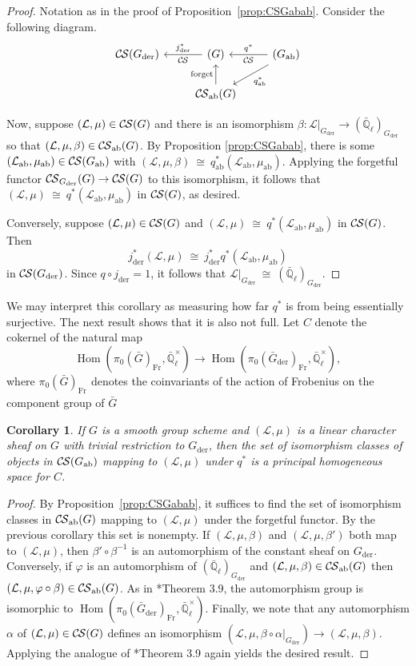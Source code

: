 \documentclass[10pt]{amsart}
\theoremstyle{plain}
\newtheorem{corollary}[theorem]{Corollary}
\theoremstyle{definition}
\newcommand{\EE}{\mathbb{\bar Q}_\ell}
\newcommand{\EEx}{\EE^\times}
\newcommand{\Frob}[1]{\operatorname{Fr}_{#1}}
\DeclareMathOperator{\Hom}{Hom}
\newcommand{\der}{_{\operatorname{der}}}
\newcommand{\ab}{_{\operatorname{ab}}}
\newcommand{\iso}{{\ \cong\ }}
\newcommand{\cs}[1]{{\mathcal{#1}}}
\newcommand{\CS}{{\mathcal{C\hskip-0.8pt S}}}
\begin{document}
\begin{proof}
Notation as in the proof of Proposition~\ref{prop:CSGabab}.
Consider the following diagram.
\[
\begin{tikzcd}
\CS(G\der) & \arrow{l}[swap]{j\der^*} \CS(G) &\arrow{l}[swap]{q^*} 
\CS(G\ab) \arrow{dl}{q\ab^*} \\
& \CS\ab(G) \arrow{u}{\text{forget}}  & 
\end{tikzcd}
\]

Now, suppose $(\cs{L},\mu)\in \CS(G)$ and there is an isomorphism $\beta : \cs{L}\vert_{G\der} \to (\EE)_{G\der}$ so that
$(\cs{L},\mu,\beta) \in \CS\ab(G)$.
By Proposition \ref{prop:CSGabab}, there is some $(\cs{L}\ab,\mu\ab)\in \CS(G\ab)$ with $(\cs{L},\mu,\beta) \iso q\ab^*(\cs{L}\ab,\mu\ab)$.
Applying the forgetful functor $\CS_{G\der}(G)\to \CS(G)$ to this isomorphism, it follows that $(\cs{L},\mu) \iso q^*(\cs{L}\ab,\mu\ab)$ in $\CS(G)$, as desired. 

Conversely, suppose $(\cs{L},\mu)\in \CS(G)$ and $(\cs{L},\mu) \iso q^*(\cs{L}\ab,\mu\ab)$ in $\CS(G)$.
Then 
\[
j\der^*(\cs{L},\mu) \iso j\der^*q^*(\cs{L}\ab,\mu\ab)
\]
 in $\CS(G\der)$.
Since $q\circ j\der = 1$, it follows that $\cs{L}\vert_{G\der} \iso (\EE)_{G\der}$.
\end{proof}

We may interpret this corollary as measuring how far $q^*$ is from being essentially surjective.  The next result shows that it is also not full.
Let $C$ denote the cokernel of the natural map
\[
\Hom(\pi_0(\bar{G})_{\Frob{}}, \EEx) \to \Hom(\pi_0(\bar{G}\der)_{\Frob{}}, \EEx),
\]
where $\pi_0(\bar{G})_{\Frob{}}$ denotes the coinvariants of the action of Frobenius on
the component group of $\bar{G}$

\begin{corollary}
If $G$ is a smooth group scheme and $(\cs{L},\mu)$ is a linear character sheaf on $G$ with trivial restriction to $G\der$,
then the set of isomorphism classes of objects in $\CS(G\ab)$ mapping to $(\cs{L},\mu)$ under $q^*$ is a principal homogeneous space
for $C$.
\end{corollary}
\begin{proof}
By Proposition~\ref{prop:CSGabab}, it suffices to find the set of isomorphism classes in $\CS\ab(G)$ mapping to
$(\cs{L},\mu)$ under the forgetful functor.  By the previous corollary this set is nonempty.
If $(\cs{L},\mu,\beta)$ and $(\cs{L},\mu,\beta')$ both map to $(\cs{L},\mu)$, then $\beta' \circ \beta^{-1}$ is an
automorphism of the constant sheaf on $G\der$.  Conversely, if $\varphi$ is an automorphism of $(\EE)_{G\der}$
and $(\cs{L},\mu,\beta) \in \CS\ab(G)$ then $(\cs{L},\mu,\varphi \circ \beta) \in \CS\ab(G)$.  As in \cite{cunningham-roe:13a}*{Theorem 3.9},
the automorphism group is isomorphic to $\Hom(\pi_0(\bar{G}\der)_{\Frob{}}, \EEx)$.  Finally, we note that any
automorphism $\alpha$ of $(\cs{L},\mu) \in \CS(G)$ defines an isomorphism $(\cs{L},\mu,\beta \circ \alpha|_{G\der}) \to (\cs{L},\mu,\beta)$.
Applying the analogue of \cite{cunningham-roe:13a}*{Theorem 3.9} again yields the desired result.
\end{proof}
\end{document}
